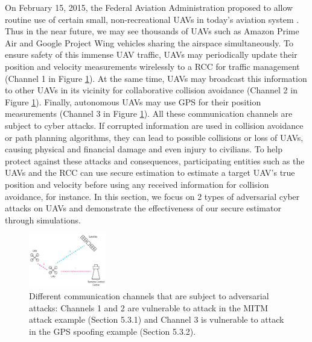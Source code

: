 \documentclass[../../thesis.tex]{subfiles}
\begin{document}
On February 15, 2015, the Federal Aviation Administration proposed to allow routine use of certain small, non-recreational UAVs in today's aviation system \cite{faa}. Thus in the near future, we may see thousands of UAVs such as Amazon Prime Air \cite{Amazon} and Google Project Wing vehicles \cite{Google} sharing the airspace simultaneously. To ensure safety of this immense UAV traffic, UAVs may periodically update their position and velocity measurements wirelessly to a RCC for traffic management (Channel 1 in Figure \ref{fig:ex_uav_pic}). At the same time, UAVs may broadcast this information to other UAVs in its vicinity for collaborative collision avoidance (Channel 2 in Figure \ref{fig:ex_uav_pic}). Finally, autonomous UAVs may use GPS for their position measurements (Channel 3 in Figure \ref{fig:ex_uav_pic}). 
All these communication channels are subject to cyber attacks. 
If corrupted information are used in collision avoidance or path planning algorithms, they can lead to possible collisions or loss of UAVs, causing physical and financial damage and even injury to civilians.
To help protect against these attacks and consequences, participating entities such as the UAVs and the RCC can use secure estimation to estimate a target UAV's true position and velocity before using any received information for collision avoidance, for instance.
In this section, we focus on 2 types of adversarial cyber attacks on UAVs and demonstrate the effectiveness of our secure estimator through simulations.
\begin{figure}
\center
\includegraphics[width=0.3\textwidth]{chapters/se_linear/figures/qh/uav_pic.pdf}
\caption{Different communication channels that are subject to adversarial attacks: Channels 1 and 2 are vulnerable to attack in the MITM attack example (Section 5.3.1) and Channel 3 is vulnerable to attack in the GPS spoofing example (Section 5.3.2).}

\label{fig:ex_uav_pic}
\end{figure}
\end{document}
